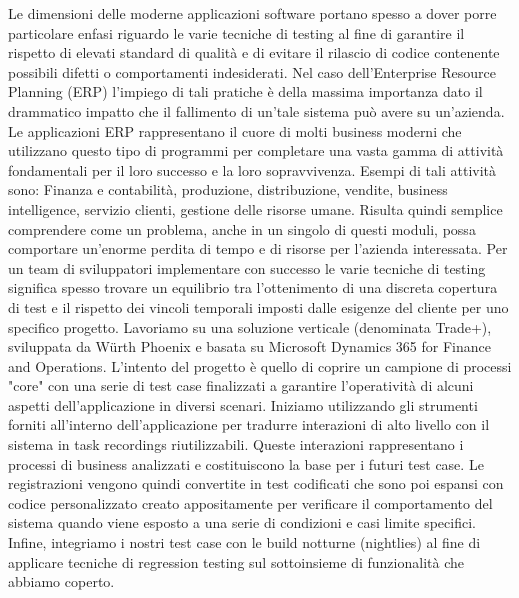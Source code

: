 Le dimensioni delle moderne applicazioni software portano spesso a dover porre particolare enfasi riguardo le varie tecniche di testing al fine di garantire il rispetto di elevati standard di qualità e di evitare il rilascio di codice contenente possibili difetti o comportamenti indesiderati. 
Nel caso dell'Enterprise Resource Planning (ERP) l'impiego di tali pratiche è della massima importanza dato il drammatico impatto che il fallimento di un'tale sistema può avere su un'azienda. 
Le applicazioni ERP rappresentano il cuore di molti business moderni che utilizzano questo tipo di programmi per completare una vasta gamma di attività fondamentali per il loro successo e la loro sopravvivenza. 
Esempi di tali attività sono: Finanza e contabilità, produzione, distribuzione, vendite, business intelligence, servizio clienti, gestione delle risorse umane. 
Risulta quindi semplice comprendere come un problema, anche in un singolo di questi moduli, possa comportare un'enorme perdita di tempo e di risorse per l'azienda interessata. 
Per un team di sviluppatori implementare con successo le varie tecniche di testing significa spesso trovare un equilibrio tra l'ottenimento di una discreta copertura di test e il rispetto dei vincoli temporali imposti dalle esigenze del cliente per uno specifico progetto. 
Lavoriamo su una soluzione verticale (denominata Trade+), sviluppata da Würth Phoenix e basata su Microsoft Dynamics 365 for Finance and Operations. L'intento del progetto è quello di coprire un campione di processi "core" con una serie di test case finalizzati a garantire l'operatività di alcuni aspetti dell'applicazione in diversi scenari. 
Iniziamo utilizzando gli strumenti forniti all'interno dell'applicazione per tradurre interazioni di alto livello con il sistema in task recordings riutilizzabili. Queste interazioni rappresentano i processi di business analizzati e costituiscono la base per i futuri test case. 
Le registrazioni vengono quindi convertite in test codificati che sono poi espansi con codice personalizzato creato appositamente per verificare il comportamento del sistema quando viene esposto a una serie di condizioni e casi limite specifici. 
Infine, integriamo i nostri test case con le build notturne (nightlies) al fine di applicare tecniche di regression testing sul sottoinsieme di funzionalità che abbiamo coperto. 

